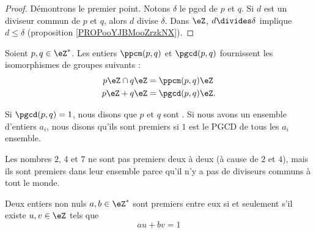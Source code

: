 \begin{proof}
    Démontrons le premier point. Notons \( \delta\) le pgcd de \( p\) et \( q\). Si \( d\) est un diviseur commun de \( p\) et \( q\), alors \( d\) divise \( \delta\). Dans \( \eZ\), \( d\divides \delta\) implique \( d\leq\delta\) (proposition \ref{PROPooYJBMooZrzkNX}).
\end{proof}

\begin{lemma}
    Soient \( p,q\in\eZ^*\). Les entiers \( \ppcm(p,q)\) et \( \pgcd(p,q)\) fournissent les isomorphismes de groupes suivants :
\begin{subequations}
    \begin{align}
        p\eZ\cap q\eZ&=\ppcm(p,q)\eZ\\
        p\eZ + q\eZ&=\pgcd(p,q)\eZ.
    \end{align}
\end{subequations}
\end{lemma}

\begin{definition}  \label{DefZHRXooNeWIcB}
    Si \( \pgcd(p,q)=1\), nous disons que \( p\) et \( q\) sont . Si nous avons un ensemble d'entiers \( a_i\), nous disons qu'ils sont premiers  si \( 1\) est le PGCD de tous les \( a_i\) ensemble.
\end{definition}

Les nombres \( 2\), \( 4\) et \( 7\) ne sont pas premiers deux à deux (à cause de \( 2\) et \( 4\)), mais ils sont premiers dans leur ensemble parce qu'il n'y a pas de diviseurs communs à tout le monde.

\begin{theorem} \label{ThoBuNjam}
    Deux entiers non nuls \( a,b\in\eZ^*\) sont premiers entre eux si et seulement s'il existe \( u,v\in\eZ\) tels que
    \begin{equation}
        au+bv=1
    \end{equation}
\end{theorem}

